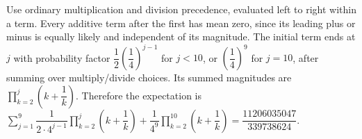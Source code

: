 Use ordinary multiplication and division precedence, evaluated left to right within a term. Every additive term after the first has mean zero, since its leading plus or minus is equally likely and independent of its magnitude. The initial term ends at $j$ with probability factor $\dfrac{1}{2}(\dfrac{1}{4})^{j-1}$ for $j<10$, or $(\dfrac{1}{4})^9$ for $j=10$, after summing over multiply/divide choices. Its summed magnitudes are $\prod_{k=2}^j(k+\dfrac{1}{k})$. Therefore the expectation is $\sum_{j=1}^9\dfrac{1}{2\cdot4^{j-1}}\prod_{k=2}^j(k+\dfrac{1}{k})+\dfrac{1}{4^9}\prod_{k=2}^{10}(k+\dfrac{1}{k})=\boxed{\dfrac{11206035047}{339738624}}$.
